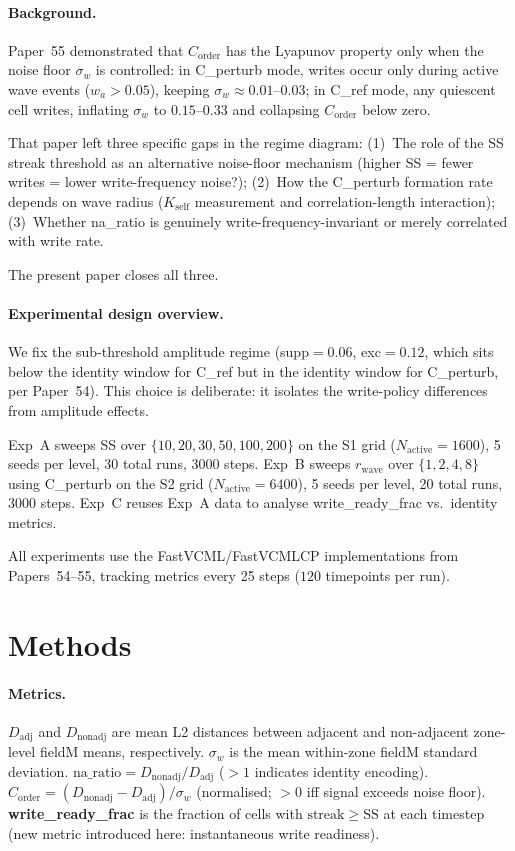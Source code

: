 \documentclass[11pt,a4paper]{article}
\newcommand{\Corder}{C_{\mathrm{order}}}
\newcommand{\Dadj}{D_{\mathrm{adj}}}
\newcommand{\Dnadj}{D_{\mathrm{nonadj}}}
\newcommand{\sw}{\sigma_w}
\newcommand{\na}{\mathrm{na\_ratio}}
\begin{document}
\paragraph{Background.}
Paper~55 demonstrated that $\Corder$ has the Lyapunov property only when the
noise floor $\sw$ is controlled: in C\_perturb mode, writes occur only during
active wave events ($w_a > 0.05$), keeping $\sw \approx 0.01$--$0.03$; in
C\_ref mode, any quiescent cell writes, inflating $\sw$ to $0.15$--$0.33$ and
collapsing $\Corder$ below zero.

That paper left three specific gaps in the regime diagram:
(1)~The role of the SS streak threshold as an alternative noise-floor mechanism
(higher SS = fewer writes = lower write-frequency noise?);
(2)~How the C\_perturb formation rate depends on wave radius
($K_\mathrm{self}$ measurement and correlation-length interaction);
(3)~Whether na\_ratio is genuinely write-frequency-invariant or merely
correlated with write rate.

The present paper closes all three.

\paragraph{Experimental design overview.}
We fix the sub-threshold amplitude regime (supp$=0.06$, exc$=0.12$, which
sits below the identity window for C\_ref but in the identity window for
C\_perturb, per Paper~54). This choice is deliberate: it isolates the
write-policy differences from amplitude effects.

Exp~A sweeps SS over $\{10, 20, 30, 50, 100, 200\}$ on the S1 grid
($N_\mathrm{active}=1600$), 5 seeds per level, 30 total runs, 3000 steps.
Exp~B sweeps $r_\mathrm{wave}$ over $\{1, 2, 4, 8\}$ using C\_perturb on the S2 grid
($N_\mathrm{active}=6400$), 5 seeds per level, 20 total runs, 3000 steps.
Exp~C reuses Exp~A data to analyse write\_ready\_frac vs.\ identity metrics.

All experiments use the FastVCML/FastVCMLCP implementations from Papers~54--55,
tracking metrics every 25 steps ($120$ timepoints per run).

\section{Methods}

\paragraph{Metrics.}
$\Dadj$ and $\Dnadj$ are mean L2 distances between adjacent and non-adjacent
zone-level fieldM means, respectively.
$\sw$ is the mean within-zone fieldM standard deviation.
$\na = \Dnadj / \Dadj$ ($>1$ indicates identity encoding).
$\Corder = (\Dnadj - \Dadj)/\sw$ (normalised; $>0$ iff signal exceeds noise floor).
\textbf{write\_ready\_frac} is the fraction of cells with
$\mathrm{streak} \geq \mathrm{SS}$ at each timestep
(new metric introduced here: instantaneous write readiness).
\end{document}
